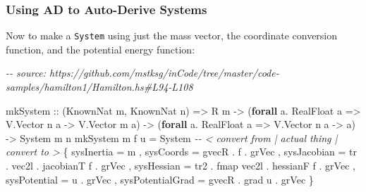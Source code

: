 \documentclass[]{article}
\newenvironment{Shaded}{}{}
\newcommand{\CommentTok}[1]{\textcolor[rgb]{0.38,0.63,0.69}{\textit{#1}}}
\newcommand{\DataTypeTok}[1]{\textcolor[rgb]{0.56,0.13,0.00}{#1}}
\newcommand{\FunctionTok}[1]{\textcolor[rgb]{0.02,0.16,0.49}{#1}}
\newcommand{\KeywordTok}[1]{\textcolor[rgb]{0.00,0.44,0.13}{\textbf{#1}}}
\newcommand{\NormalTok}[1]{#1}
\newcommand{\OperatorTok}[1]{\textcolor[rgb]{0.40,0.40,0.40}{#1}}
\newcommand{\OtherTok}[1]{\textcolor[rgb]{0.00,0.44,0.13}{#1}}
\begin{document}
\hypertarget{using-ad-to-auto-derive-systems}{%
\subsubsection{Using AD to Auto-Derive
Systems}\label{using-ad-to-auto-derive-systems}}

Now to make a \texttt{System} using just the mass vector, the coordinate
conversion function, and the potential energy function:

\begin{Shaded}
\begin{Highlighting}[]
\CommentTok{{-}{-} source: https://github.com/mstksg/inCode/tree/master/code{-}samples/hamilton1/Hamilton.hs\#L94{-}L108}

\NormalTok{mkSystem}
\OtherTok{    ::}\NormalTok{ (}\DataTypeTok{KnownNat}\NormalTok{ m, }\DataTypeTok{KnownNat}\NormalTok{ n)}
    \OtherTok{=>} \DataTypeTok{R}\NormalTok{ m}
    \OtherTok{{-}>}\NormalTok{ (}\KeywordTok{forall}\NormalTok{ a}\OperatorTok{.} \DataTypeTok{RealFloat}\NormalTok{ a }\OtherTok{=>} \DataTypeTok{V.Vector}\NormalTok{ n a }\OtherTok{{-}>} \DataTypeTok{V.Vector}\NormalTok{ m a)}
    \OtherTok{{-}>}\NormalTok{ (}\KeywordTok{forall}\NormalTok{ a}\OperatorTok{.} \DataTypeTok{RealFloat}\NormalTok{ a }\OtherTok{=>} \DataTypeTok{V.Vector}\NormalTok{ n a }\OtherTok{{-}>}\NormalTok{ a)}
    \OtherTok{{-}>} \DataTypeTok{System}\NormalTok{ m n}
\NormalTok{mkSystem m f u }\OtherTok{=} \DataTypeTok{System}
                    \CommentTok{{-}{-} < convert from      | actual thing | convert to >}
\NormalTok{    \{ sysInertia       }\OtherTok{=}\NormalTok{                     m}
\NormalTok{    , sysCoords        }\OtherTok{=}\NormalTok{        gvecR      }\OperatorTok{.}\NormalTok{ f            }\OperatorTok{.}\NormalTok{ grVec}
\NormalTok{    , sysJacobian      }\OtherTok{=}\NormalTok{ tr   }\OperatorTok{.}\NormalTok{ vec2l      }\OperatorTok{.}\NormalTok{ jacobianT f  }\OperatorTok{.}\NormalTok{ grVec}
\NormalTok{    , sysHessian       }\OtherTok{=}\NormalTok{ tr2  }\OperatorTok{.} \FunctionTok{fmap}\NormalTok{ vec2l }\OperatorTok{.}\NormalTok{ hessianF f   }\OperatorTok{.}\NormalTok{ grVec}
\NormalTok{    , sysPotential     }\OtherTok{=}\NormalTok{                     u            }\OperatorTok{.}\NormalTok{ grVec}
\NormalTok{    , sysPotentialGrad }\OtherTok{=}\NormalTok{        gvecR      }\OperatorTok{.}\NormalTok{ grad u       }\OperatorTok{.}\NormalTok{ grVec}
\NormalTok{    \}}
\end{Highlighting}
\end{Shaded}
\end{document}
